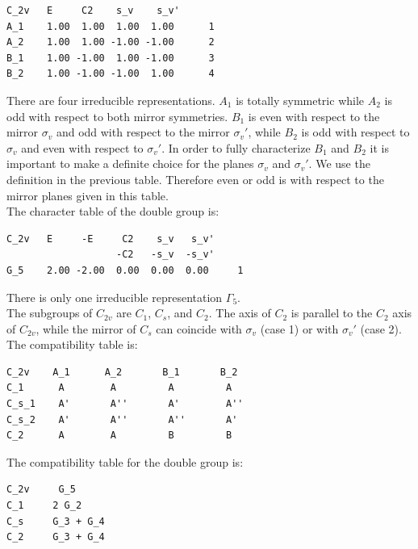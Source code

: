 \documentclass[12pt,a4paper]{article}
\begin{document}
\begin{verbatim}
C_2v   E     C2    s_v    s_v'
A_1    1.00  1.00  1.00  1.00      1
A_2    1.00  1.00 -1.00 -1.00      2
B_1    1.00 -1.00  1.00 -1.00      3
B_2    1.00 -1.00 -1.00  1.00      4
\end{verbatim}
There are four irreducible representations. $A_1$ is totally symmetric while
$A_2$ is odd with respect to both mirror symmetries.  
$B_1$ is even with respect to the mirror $\sigma_v$ and odd with respect to
the mirror $\sigma_v'$, while $B_2$ is odd with respect to $\sigma_v$ and even 
with respect to $\sigma_v'$. In order to fully characterize $B_1$ and $B_2$
it is important to make a definite choice for the planes $\sigma_v$ and $\sigma_v'$.
We use the definition in the previous table. Therefore even or odd is with respect
to the mirror planes given in this table. \\
The character table of the double group is:
\begin{verbatim}
C_2v   E     -E     C2    s_v   s_v'
                   -C2   -s_v  -s_v'
G_5    2.00 -2.00  0.00  0.00  0.00     1
\end{verbatim}
There is only one irreducible representation $\Gamma_5$. \\
The subgroups of $C_{2v}$ are $C_1$, $C_s$, and $C_2$. The axis of $C_2$ is 
parallel to the $C_2$ axis of $C_{2v}$, while the mirror of $C_s$ can coincide
with $\sigma_v$ (case 1) or with $\sigma_v'$ (case 2). \\
The compatibility table is:
\begin{verbatim}
C_2v    A_1      A_2       B_1       B_2
C_1      A        A         A         A
C_s_1    A'       A''       A'        A''
C_s_2    A'       A''       A''       A'
C_2      A        A         B         B
\end{verbatim}
The compatibility table for the double group is:
\begin{verbatim}
C_2v     G_5
C_1     2 G_2
C_s     G_3 + G_4
C_2     G_3 + G_4
\end{verbatim}
\end{document}
